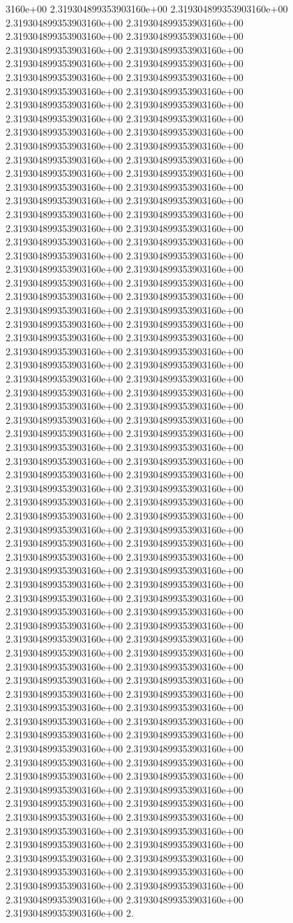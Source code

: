 3160e+00	2.319304899353903160e+00	2.319304899353903160e+00	2.319304899353903160e+00	2.319304899353903160e+00	2.319304899353903160e+00	2.319304899353903160e+00	2.319304899353903160e+00	2.319304899353903160e+00	2.319304899353903160e+00	2.319304899353903160e+00	2.319304899353903160e+00	2.319304899353903160e+00	2.319304899353903160e+00	2.319304899353903160e+00	2.319304899353903160e+00	2.319304899353903160e+00	2.319304899353903160e+00	2.319304899353903160e+00	2.319304899353903160e+00	2.319304899353903160e+00	2.319304899353903160e+00	2.319304899353903160e+00	2.319304899353903160e+00	2.319304899353903160e+00	2.319304899353903160e+00	2.319304899353903160e+00	2.319304899353903160e+00	2.319304899353903160e+00	2.319304899353903160e+00	2.319304899353903160e+00	2.319304899353903160e+00	2.319304899353903160e+00	2.319304899353903160e+00	2.319304899353903160e+00	2.319304899353903160e+00	2.319304899353903160e+00	2.319304899353903160e+00	2.319304899353903160e+00	2.319304899353903160e+00	2.319304899353903160e+00	2.319304899353903160e+00	2.319304899353903160e+00	2.319304899353903160e+00	2.319304899353903160e+00	2.319304899353903160e+00	2.319304899353903160e+00	2.319304899353903160e+00	2.319304899353903160e+00	2.319304899353903160e+00	2.319304899353903160e+00	2.319304899353903160e+00	2.319304899353903160e+00	2.319304899353903160e+00	2.319304899353903160e+00	2.319304899353903160e+00	2.319304899353903160e+00	2.319304899353903160e+00	2.319304899353903160e+00	2.319304899353903160e+00	2.319304899353903160e+00	2.319304899353903160e+00	2.319304899353903160e+00	2.319304899353903160e+00	2.319304899353903160e+00	2.319304899353903160e+00	2.319304899353903160e+00	2.319304899353903160e+00	2.319304899353903160e+00	2.319304899353903160e+00	2.319304899353903160e+00	2.319304899353903160e+00	2.319304899353903160e+00	2.319304899353903160e+00	2.319304899353903160e+00	2.319304899353903160e+00	2.319304899353903160e+00	2.319304899353903160e+00	2.319304899353903160e+00	2.319304899353903160e+00	2.319304899353903160e+00	2.319304899353903160e+00	2.319304899353903160e+00	2.319304899353903160e+00	2.319304899353903160e+00	2.319304899353903160e+00	2.319304899353903160e+00	2.319304899353903160e+00	2.319304899353903160e+00	2.319304899353903160e+00	2.319304899353903160e+00	2.319304899353903160e+00	2.319304899353903160e+00	2.319304899353903160e+00	2.319304899353903160e+00	2.319304899353903160e+00	2.319304899353903160e+00	2.319304899353903160e+00	2.319304899353903160e+00	2.319304899353903160e+00	2.319304899353903160e+00	2.319304899353903160e+00	2.319304899353903160e+00	2.319304899353903160e+00	2.319304899353903160e+00	2.319304899353903160e+00	2.319304899353903160e+00	2.319304899353903160e+00	2.319304899353903160e+00	2.319304899353903160e+00	2.319304899353903160e+00	2.319304899353903160e+00	2.319304899353903160e+00	2.319304899353903160e+00	2.319304899353903160e+00	2.319304899353903160e+00	2.319304899353903160e+00	2.319304899353903160e+00	2.319304899353903160e+00	2.319304899353903160e+00	2.319304899353903160e+00	2.319304899353903160e+00	2.319304899353903160e+00	2.319304899353903160e+00	2.319304899353903160e+00	2.319304899353903160e+00	2.319304899353903160e+00	2.319304899353903160e+00	2.319304899353903160e+00	2.319304899353903160e+00	2.319304899353903160e+00	2.319304899353903160e+00	2.319304899353903160e+00	2.319304899353903160e+00	2.